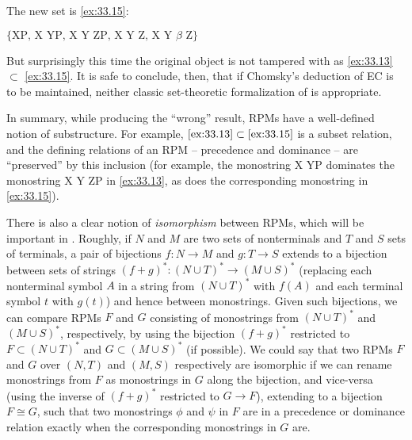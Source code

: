 \documentclass[output=paper]{langsci/langscibook}
\begin{document}
\noindent The new set is \eqref{ex:33.15}:

\ea\label{ex:33.15} $\{\text{XP, X YP, X Y ZP, X Y Z, X Y $\beta$ Z}\}$
\z

But surprisingly this time the original object is not tampered with as
\eqref{ex:33.13} $\subset$ \eqref{ex:33.15}. It is safe to conclude,
then, that if Chomsky's deduction of \gls{EC} is to be maintained, neither
classic set-theoretic formalization of  is appropriate.

In summary, while producing the \enquote{wrong} result, \glspl{RPM} have a
well-defined notion of substructure. For example, $\eqref{ex:33.13}\subset
\eqref{ex:33.15}$ is a subset relation, and the defining relations of an
\gls{RPM} -- precedence and dominance -- are \enquote{preserved} by this
inclusion (for example, the monostring X YP dominates the monostring X Y ZP in
\eqref{ex:33.13}, as does the corresponding monostring in
\eqref{ex:33.15}).

There is also a clear notion of \emph{isomorphism} between R\glspl{PM}, which
will be important in . Roughly, if $N$ and $M$ are two sets of nonterminals
and $T$ and $S$ sets of terminals, a pair of bijections $f: N\rightarrow M$ and
$g:T\rightarrow S$ extends to a bijection between sets of strings $(f+g)^*:
(N\cup T)^*\rightarrow (M\cup S)^*$ (replacing each nonterminal symbol $A$ in a
string from $(N\cup T)^*$ with $f(A)$ and each terminal symbol $t$ with
$g(t)$) and hence between monostrings. Given such bijections, we can compare
R\glspl{PM} $F$ and $G$ consisting of monostrings from $(N\cup T)^*$ and
$(M\cup S)^*$, respectively, by using the bijection $(f+g)^*$ restricted to
$F\subset(N\cup T)^*$ and $G\subset (M\cup S)^*$ (if possible). We could say
that two \glspl{RPM} $F$ and $G$ over $(N,T)$  and $(M,S)$ respectively are
isomorphic if we can rename monostrings from $F$ as monostrings in $G$ along
the bijection, and vice-versa (using the inverse of $(f+g)^*$ restricted to
$G\rightarrow F$), extending to a bijection $F\cong G$, such that two
monostrings $\phi$ and $\psi$ in $F$ are in a precedence or dominance relation
exactly when the corresponding monostrings in $G$ are.

\end{document}
